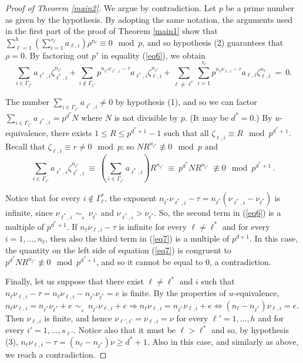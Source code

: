 \documentclass[11pt]{amsart}
\theoremstyle{definition}
\theoremstyle{remark}
\numberwithin{equation}{section}
\begin{document}
\medskip
\begin{proof}[Proof of Theorem \ref{main2}]
We argue by contradiction.
Let $p$ be a prime number as given by the hypothesis.
By adopting the same notation, the arguments 
used in the first part of the proof of Theorem \ref{main1}
show that
$\sum_{\ell=1}^h 
\left(\sum_{i=1}^{s_\ell}a_{\ell,i}\right)\rho^{n_\ell}\equiv 0\mod p$,
and so hypothesis (2) guarantees that $\rho=0$. 
By factoring out $p^{\tau}$ 
in equality (\ref{eq6}), we obtain
\begin{equation}\label{eq7}
\sum_{i\in\Gamma_{\ell^*}}a_{\ell^*\!,i}\zeta_{\ell^*\!,i}^{n_{\ell^*}}+
\sum_{i\notin\Gamma_{\ell^*}}
p^{n_{\ell^*}\nu_{\ell^*\!,i}-\tau}
a_{\ell^*\!,i}\zeta_{\ell,i}^{n_{\ell^*}}+
\sum_{\ell\ne\ell^*}\sum_{i=1}^{s_\ell} 
p^{n_\ell\nu_{\ell,i}-\tau}a_{\ell,i}\zeta_{\ell,i}^{n_\ell}\ =\ 0.
\end{equation}

The number $\sum_{i\in\Gamma_{\ell^*}}a_{\ell^*\!,i}\ne 0$
by hypothesis (1), and so we can factor 
$\sum_{i\in\Gamma_{\ell^*}}a_{\ell^*\!,i}=p^{d^*}\!N$ where
$N$ is not divisible by $p$. (It may be $d^*=0$.) By $u$-equivalence,
there exists $1\le R\le p^{d^*+1}-1$ such that
all $\zeta_{\ell,i}\equiv R\mod p^{d^*+1}$. 
Recall that $\zeta_{\ell,i}\equiv r\ne 0\mod p$;
so $N R^{n_{\ell^*}}\not\equiv 0\mod p$ and
\begin{equation}
\sum_{i\in\Gamma_{\ell^*}}a_{\ell^*\!,i}
\zeta_{\ell^*\!,i}^{n_{\ell^*}}\ \equiv\ 
\left(\sum_{i\in\Gamma_{\ell^*}}a_{\ell^*\!,i}\right)\!R^{n_{\ell^*}}\ \equiv\ 
p^{d^*}\!N R^{n_{\ell^*}}\ \not\equiv 0\mod p^{d^*+1}\,.
\end{equation}

Notice that for every $i\notin\Gamma_\ell^*$,
the exponent $n_{\ell^*}\nu_{\ell^*\!,i}-\tau=
n_{\ell^*}(\nu_{\ell^*\!,i}-\nu_{\ell^*})$
is infinite, since $\nu_{\ell^*\!,i}\,{{\,{\sim}_{{}_{\!\!\!\!\! u}}\;}}\,\nu_{\ell^*}$
and $\nu_{\ell^*\!,i}>\nu_{\ell^*}$. So, the
second term in (\ref{eq6}) is a multiple of $p^{d^*+1}$.
If $n_\ell\nu_{\ell,i}-\tau$ is infinite
for every $\ell\ne\ell^*$ and for every $i=1,\ldots,n_\ell$,
then also the third term in (\ref{eq7})
is a multiple of $p^{d+1}$. In this case,
the quantity on the left side of equation
(\ref{eq7}) is congruent to $p^{d^*}\!N R^{n_{\ell^*}}
\not\equiv 0\mod p^{d^*+1}$, and so it cannot be
equal to $0$, a contradiction.

Finally, let us suppose that there exist $\ell\ne\ell^*$ 
and $i$ such that 
$n_{\ell}\nu_{\ell,i}-\tau=n_{\ell}\nu_{\ell,i}-n_{\ell^*}\nu_{\ell^*}=e$
is finite. By the properties of $u$-equivalence,
$n_{\ell}\nu_{\ell,i}=n_{\ell^*}\nu_{\ell^*}+e\,{{\,{\sim}_{{}_{\!\!\!\!\! u}}\;}}\,
n_{\ell^*}\nu_{\ell,i}+e\Rightarrow
n_{\ell}\nu_{\ell,i}=n_{\ell^*}\nu_{\ell,i}+e\Leftrightarrow 
(n_{\ell}-n_{\ell^*})\nu_{\ell,i}=e$.
Then $\nu_{\ell,i}$ is finite, and hence
$\nu_{\ell',i'}=\nu_{\ell,i}=\nu$ for every $\ell'=1,\ldots,h$ 
and for every $i'=1,\ldots,s_{\ell'}$.
Notice also that it must be $\ell>\ell^*$ and so, by hypothesis (3),
$n_{\ell}\nu_{\ell,i}-\tau=(n_\ell-n_{\ell^*})\nu\ge d^*+1$.
Also in this case, and similarly as above,
we reach a contradiction.
\end{proof}
\end{document}

